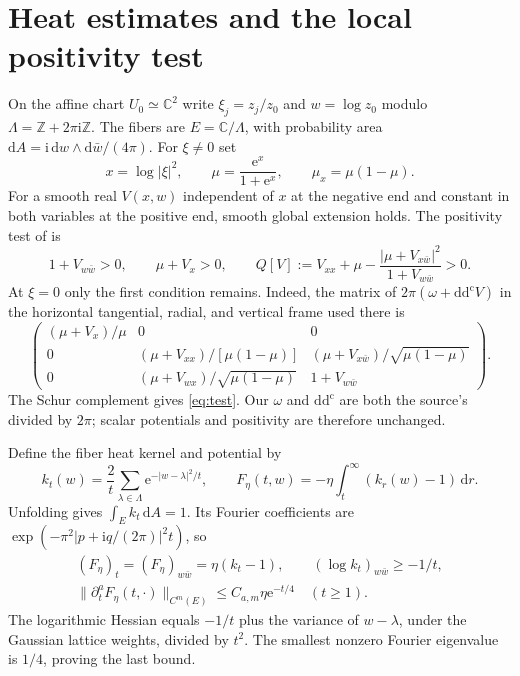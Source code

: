 \documentclass[11pt]{article}
\theoremstyle{remark}
\newcommand{\ddc}{\mathrm{d}\mathrm{d}^{\mathrm c}}
\newcommand{\C}{\mathbb C}
\begin{document}
\section{Heat estimates and the local positivity test}
On the affine chart $U_0\simeq\C^2$ write
$\xi_j=z_j/z_0$ and $w=\log z_0$ modulo
$\Lambda=\mathbb Z+2\pi\mathrm i\mathbb Z$.
The fibers are $E=\C/\Lambda$, with probability area
$\mathrm dA=\mathrm i\,\mathrm dw\wedge\mathrm d\bar w/(4\pi)$.
For $\xi\ne0$ set
\[
 x=\log|\xi|^2,\qquad \mu=\frac{\mathrm e^x}{1+\mathrm e^x},
 \qquad \mu_x=\mu(1-\mu).
\]
For a smooth real $V(x,w)$ independent of $x$ at the negative end and
constant in both variables at the positive end, smooth global extension
holds. The positivity test of \cite[Lemma 2.2]{XZ} is
\begin{equation}\label{eq:test}
 1+V_{w\bar w}>0,\qquad \mu+V_x>0,\qquad
 Q[V]:=V_{xx}+\mu-
          \frac{|\mu+V_{x\bar w}|^2}{1+V_{w\bar w}}>0.
\end{equation}
At $\xi=0$ only the first condition remains. Indeed, the matrix of
$2\pi(\omega+\ddc V)$ in the horizontal tangential, radial, and vertical
frame used there is
\[
 \begin{pmatrix}
 (\mu+V_x)/\mu&0&0\\
 0&(\mu+V_{xx})/[\mu(1-\mu)]&
                      (\mu+V_{x\bar w})/\sqrt{\mu(1-\mu)}\\
 0&(\mu+V_{wx})/\sqrt{\mu(1-\mu)}&1+V_{w\bar w}
 \end{pmatrix}.
\]
The Schur complement gives \eqref{eq:test}. Our $\omega$ and $\ddc$ are
both the source's divided by $2\pi$; scalar potentials and positivity are
therefore unchanged.

Define the fiber heat kernel and potential by
\begin{equation}\label{eq:heat}
 k_t(w)=\frac2t\sum_{\lambda\in\Lambda}\mathrm e^{-|w-\lambda|^2/t},
 \qquad
 F_\eta(t,w)=-\eta\int_t^\infty(k_r(w)-1)\,\mathrm dr.
\end{equation}
Unfolding gives $\int_Ek_t\,\mathrm dA=1$.
Its Fourier coefficients are
$\exp(-\pi^2|p+\mathrm iq/(2\pi)|^2t)$, so
\begin{gather}
 (F_\eta)_t=(F_\eta)_{w\bar w}=\eta(k_t-1),\qquad
 (\log k_t)_{w\bar w}\geq-1/t,\label{eq:heatfacts}\\
 \|\partial_t^aF_\eta(t,\cdot)\|_{C^m(E)}
       \leq C_{a,m}\eta\mathrm e^{-t/4}\quad(t\geq1).
 \label{eq:largetime}
\end{gather}
The logarithmic Hessian equals $-1/t$ plus the variance of $w-\lambda$,
under the Gaussian lattice weights, divided by $t^2$.
The smallest nonzero Fourier eigenvalue is $1/4$, proving the last bound.
\end{document}
